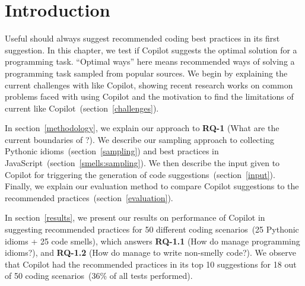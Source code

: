 \label{chapter:methodology}

\section{Introduction}
Useful \cct{} should always suggest recommended coding best practices in its first suggestion. In this chapter, we test if Copilot suggests the optimal solution for a programming task. ``Optimal ways'' here means recommended ways of solving a programming task sampled from popular sources.
We begin by explaining the current challenges with \cct{} like Copilot, showing recent research works on common problems faced with using Copilot and the motivation to find the limitations of current \cct{} like Copilot~(section~\ref{challenges}).

In section~\ref{methodology}, we explain our approach to \textbf{RQ-1} (What are the current boundaries of \cct{}?). 
We describe our sampling approach to collecting Pythonic idioms~(section~\ref{sampling}) and best practices in JavaScript~(section~\ref{smells:sampling}). We then describe the input given to Copilot for triggering the generation of code suggestions~(section~\ref{input}).
Finally, we explain our evaluation method to compare Copilot suggestions to the recommended practices~(section~\ref{evaluation}).

In section~\ref{results}, we present our results on performance of Copilot in suggesting recommended practices for 50 different coding scenarios~(25 Pythonic idioms + 25 code smells), which answers \textbf{RQ-1.1} (How do \cct{} manage programming idioms?), and \textbf{RQ-1.2} (How do \cct{} manage to write non-smelly code?).
We observe that Copilot had the recommended practices in its top 10 suggestions for 18 out of 50 coding scenarios~(36\% of all tests performed).



